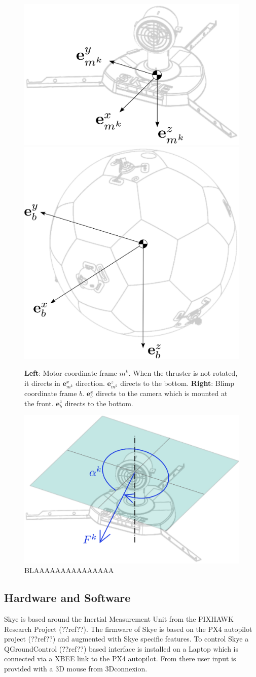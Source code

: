 \begin{figure}[hbtp]
\centering
\includegraphics[width=.4\linewidth]{images/motor_frame.eps}
\includegraphics[width=.4\linewidth]{images/blimp_frame.eps}
\caption{\textbf{Left}: Motor coordinate frame $m^k$. When the thruster is not rotated, it directs in $\mathbf{e}^x_{m^k}$ direction. $\mathbf{e}^z_{m^k}$ directs to the bottom. \textbf{Right}: Blimp coordinate frame $b$. $\mathbf{e}^x_{b}$ directs to the camera which is mounted at the front. $\mathbf{e}^z_{b}$ directs to the bottom.}
\label{fig:frames}
\end{figure}


\begin{figure}[hbtp]
\centering
\includegraphics[width=.4\linewidth]{images/motor_force.eps}
\caption{BLAAAAAAAAAAAAAAA}
\label{fig:motor_force}
\end{figure}

\subsection{Hardware and Software}
Skye is based around the Inertial Measurement Unit from the PIXHAWK Research Project (??ref??). 
The firmware of Skye is based on the PX4 autopilot project (??ref??) and augmented with Skye specific features.
To control Skye a QGroundControl (??ref??) based interface is installed on a Laptop which is connected via a XBEE link to the PX4 autopilot.
From there user input is provided with a 3D mouse from 3Dconnexion.

